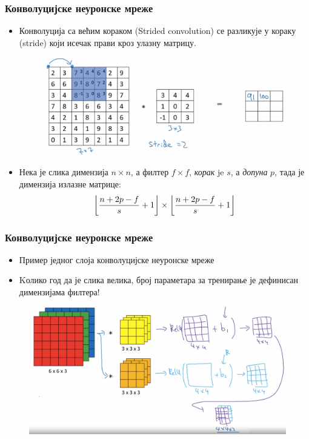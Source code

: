 \begin{frame}
\frametitle{Конволуцијске неуронске мреже}
\begin{itemize}
 \item \alert{Конволуција са већим кораком} (\alert{Strided convolution})
  се разликује у \alert{кораку} (\alert{stride}) који исечак прави
  кроз улазну матрицу.
  \begin{figure}[H]
    \centering
	\includegraphics[scale=0.22]{slike/ngConvStride1.png}
  \end{figure}
 \item Нека је слика димензија $n \times n$, а филтер $f \times f$,
 \textit{корак} je $s$, а
 \textit{допуна} $p$,
  тада је \alert{димензија излазне матрице}:
  \begin{equation*}
  \floor*{\frac{n+2p-f}{s}+1} \times \floor*{\frac{n+2p-f}{s}+1}
  \end{equation*}
\end{itemize}
\end{frame}

\begin{frame}
\frametitle{Конволуцијске неуронске мреже}
\begin{itemize}
 \item Пример једног слоја конволуцијске неуронске мреже
 \item \alert{Kолико год да је слика велика,
  број параметара за тренирање је дефинисан димензијама филтера!}
\end{itemize}
\begin{figure}[H]
    \centering
	\includegraphics[scale=0.22]{slike/ngConvLay1.png}
  \end{figure}
\end{frame}

